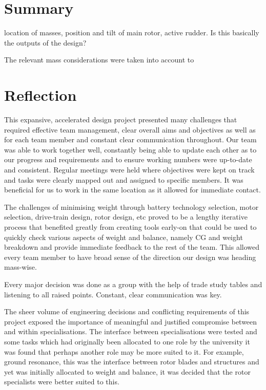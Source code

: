 \documentclass[11pt,a4paper]{article}
\begin{document}
\section{Summary}
location of masses, position and tilt of main rotor, active rudder. Is this basically the outputs of the design?

The relevant mass considerations were taken into account to 



\section{Reflection}
This expansive, accelerated design project presented many challenges that required effective team management, clear overall aims and objectives as well as for each team member and constant clear communication throughout. 
Our team was able to work together well, constantly being able to update each other as to our progress and requirements and to ensure working numbers were up-to-date and consistent. Regular meetings were held where objectives were kept on track and tasks were clearly mapped out and assigned to specific members. It was beneficial for us to work in the same location as it allowed for immediate contact. 

The challenges of minimising weight through battery technology selection, motor selection, drive-train design, rotor design, etc proved to be a lengthy iterative process that benefited greatly from creating tools early-on that could be used to quickly check various aspects of weight and balance, namely CG and weight breakdown and provide immediate feedback to the rest of the team. This allowed every team member to have broad sense of the direction our design was heading mass-wise.

Every major decision was done as a group with the help of trade study tables and listening to all raised points. Constant, clear communication was key.

The sheer volume of engineering decisions and conflicting requirements of this project exposed the importance of meaningful and justified compromise between and within specialisations. The interface between specialisations were tested and some tasks which had originally been allocated to one role by the university it was found that perhaps another role may be more suited to it. For example, ground resonance, this was the interface between rotor blades and structures and yet was initially allocated to weight and balance, it was decided that the rotor specialists were better suited to this.
\end{document}
